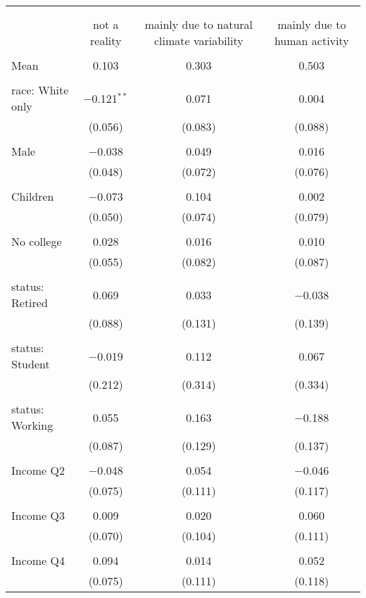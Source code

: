 
\begin{tabular}{@{\extracolsep{5pt}}lccc} 
\\[-1.8ex]\hline 
\hline \\[-1.8ex] 
\\[-1.8ex] & not a reality & mainly due to natural climate variability & mainly due to human activity \\ 
\hline \\[-1.8ex] 
 Mean & 0.103 & 0.303 & 0.503  \\ \hline \\[-1.8ex] race: White only & $-$0.121$^{**}$ & 0.071 & 0.004 \\ 
  & (0.056) & (0.083) & (0.088) \\ 
  & & & \\ 
 Male & $-$0.038 & 0.049 & 0.016 \\ 
  & (0.048) & (0.072) & (0.076) \\ 
  & & & \\ 
 Children & $-$0.073 & 0.104 & 0.002 \\ 
  & (0.050) & (0.074) & (0.079) \\ 
  & & & \\ 
 No college & 0.028 & 0.016 & 0.010 \\ 
  & (0.055) & (0.082) & (0.087) \\ 
  & & & \\ 
 status: Retired & 0.069 & 0.033 & $-$0.038 \\ 
  & (0.088) & (0.131) & (0.139) \\ 
  & & & \\ 
 status: Student & $-$0.019 & 0.112 & 0.067 \\ 
  & (0.212) & (0.314) & (0.334) \\ 
  & & & \\ 
 status: Working & 0.055 & 0.163 & $-$0.188 \\ 
  & (0.087) & (0.129) & (0.137) \\ 
  & & & \\ 
 Income Q2 & $-$0.048 & 0.054 & $-$0.046 \\ 
  & (0.075) & (0.111) & (0.117) \\ 
  & & & \\ 
 Income Q3 & 0.009 & 0.020 & 0.060 \\ 
  & (0.070) & (0.104) & (0.111) \\ 
  & & & \\ 
 Income Q4 & 0.094 & 0.014 & 0.052 \\ 
  & (0.075) & (0.111) & (0.118) \\ 

\end{tabular}

